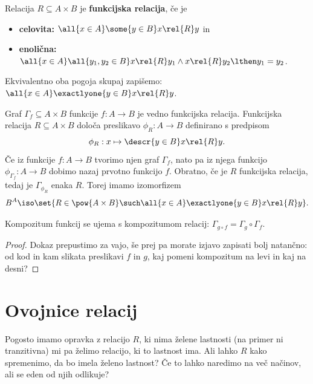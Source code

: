 \begin{definicija}
  Relacija $R \subseteq A \times B$ je \textbf{funkcijska relacija}, če je
  \begin{itemize}
  \item \textbf{celovita:} $\all{x \in A} \some{y \in B} x \rel{R} y$ in
  \item \textbf{enolična:} $\all{x \in A} \all{y_1, y_2 \in B} x \rel{R} y_1 \land x \rel{R} y_2 \lthen y_1 = y_2$.
  \end{itemize}
  Ekvivalentno oba pogoja skupaj zapišemo: $\all{x \in A} \exactlyone{y \in B} x \rel{R} y$.
\end{definicija}

Graf $\Gamma_{\!f} \subseteq A \times B$ funkcije $f : A \to B$ je vedno funkcijska relacija.
%
Funkcijska relacija $R \subseteq A \times B$ določa preslikavo $\phi_R : A \to B$ definirano s predpisom
%
\begin{equation*}
  \phi_R : x \mapsto \descr{y \in B} x \rel{R} y.
\end{equation*}
%
Če iz funkcije $f : A \to B$ tvorimo njen graf $\Gamma_{\!f}$, nato pa iz njega funkcijo
$\phi_{\Gamma_{\!f}} : A \to B$ dobimo nazaj prvotno funkcijo $f$. Obratno, če je $R$ funkcijska relacija, tedaj je $\Gamma_{\phi_R}$ enaka $R$. Torej imamo izomorfizem
%
\begin{equation*}
  B^A \iso \set{ R \in \pow{A \times B} \such \all{x \in A} \exactlyone{y \in B} x \rel{R} y }.
\end{equation*}
%

\begin{izjava}
  Kompozitum funkcij se ujema s kompozitumom relacij:
  $\Gamma_{g \circ f} = \Gamma_g \circ \Gamma_{\!f}$.
\end{izjava}

\begin{proof}
  Dokaz prepustimo za vajo, še prej pa morate izjavo zapisati bolj natančno: od
  kod in kam slikata preslikavi $f$ in $g$, kaj pomeni kompozitum na levi in kaj
  na desni?
\end{proof}


\section{Ovojnice relacij}

Pogosto imamo opravka z relacijo $R$, ki nima želene lastnosti (na primer ni
tranzitivna) mi pa želimo relacijo, ki to lastnost ima. Ali lahko $R$ kako
spremenimo, da bo imela želeno lastnost? Če to lahko naredimo na več načinov,
ali se eden od njih odlikuje?


